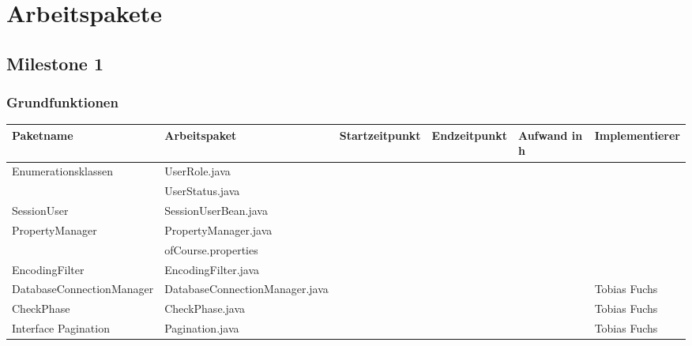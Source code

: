 \chapter{Arbeitspakete}
\begin{landscape}
\section{Milestone 1}

\subsection{Grundfunktionen}
\begin{tabular}{|p{6cm} |p{6cm}|p{3cm}|p{3cm}|p{2cm}|p{3cm}|}
	\hline \textbf{Paketname} & \textbf{Arbeitspaket} & \textbf{Startzeitpunkt} & \textbf{Endzeitpunkt} & \textbf{Aufwand in h} & \textbf{Implementierer} \\ 
	\hline  Enumerationsklassen  & UserRole.java                            &                            &                             &                     &\\ 
	& UserStatus.java                          &                            &                             &                     &\\ 
	\hline  SessionUser          & SessionUserBean.java                     &                            &                             &                     &\\ 
	\hline  PropertyManager      & PropertyManager.java                     &                            &                             &                     &\\ 
	& ofCourse.properties                      &                            &                             &                     &\\
	\hline  EncodingFilter       & EncodingFilter.java                      &                            &                             &                     &\\ 
	\hline  DatabaseConnectionManager       &  DatabaseConnectionManager.java                      &                            &                             &              & Tobias Fuchs\\   
	\hline  CheckPhase           & CheckPhase.java                            &                            &                             &                     & Tobias Fuchs\\
	\hline  Interface Pagination & Pagination.java                            &                            &                             &                     & Tobias Fuchs\\

\end{tabular}
\end{landscape}

